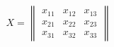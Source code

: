     \begin{center}
        \begin{equation*}
            X =
            \begin{Vmatrix}
                x_{11} & x_{12} & x_{13} \\
                x_{21} & x_{22} & x_{23} \\
                x_{31} & x_{32} & x_{33}
            \end{Vmatrix}
        \end{equation*}
    \end{center}
